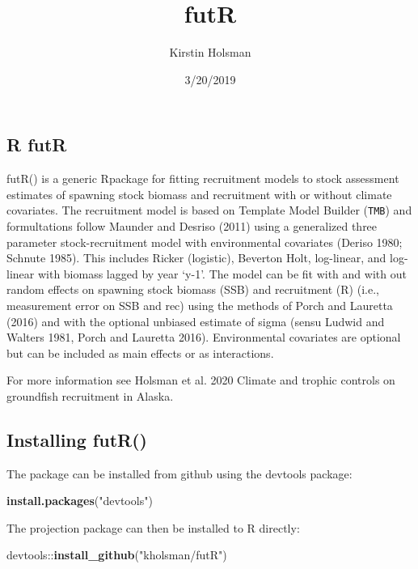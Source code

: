 \documentclass[]{article}
\title{futR}
\author{Kirstin Holsman}
\date{3/20/2019}
\newenvironment{Shaded}{\begin{snugshade}}{\end{snugshade}}
\newcommand{\KeywordTok}[1]{\textcolor[rgb]{0.13,0.29,0.53}{\textbf{{#1}}}}
\newcommand{\StringTok}[1]{\textcolor[rgb]{0.31,0.60,0.02}{{#1}}}
\newcommand{\NormalTok}[1]{{#1}}
\begin{document}
\maketitle

\subsection{R futR}\label{r-futr}

futR() is a generic Rpackage for fitting recruitment models to stock
assessment estimates of spawning stock biomass and recruitment with or
without climate covariates. The recruitment model is based on Template
Model Builder (\texttt{TMB}) and formultations follow Maunder and
Desriso (2011) using a generalized three parameter stock-recruitment
model with environmental covariates (Deriso 1980; Schnute 1985). This
includes Ricker (logistic), Beverton Holt, log-linear, and log-linear
with biomass lagged by year `y-1'. The model can be fit with and with
out random effects on spawning stock biomass (SSB) and recruitment (R)
(i.e., measurement error on SSB and rec) using the methods of Porch and
Lauretta (2016) and with the optional unbiased estimate of sigma (sensu
Ludwid and Walters 1981, Porch and Lauretta 2016). Environmental
covariates are optional but can be included as main effects or as
interactions.

For more information see Holsman et al. 2020 Climate and trophic
controls on groundfish recruitment in Alaska.

\subsection{Installing futR()}\label{installing-futr}

The package can be installed from github using the devtools package:

\begin{Shaded}
\begin{Highlighting}[]
\KeywordTok{install.packages}\NormalTok{(}\StringTok{"devtools"}\NormalTok{)}
\end{Highlighting}
\end{Shaded}

The projection package can then be installed to R directly:

\begin{Shaded}
\begin{Highlighting}[]
\NormalTok{devtools::}\KeywordTok{install_github}\NormalTok{(}\StringTok{"kholsman/futR"}\NormalTok{)}
\end{Highlighting}
\end{Shaded}
\end{document}
